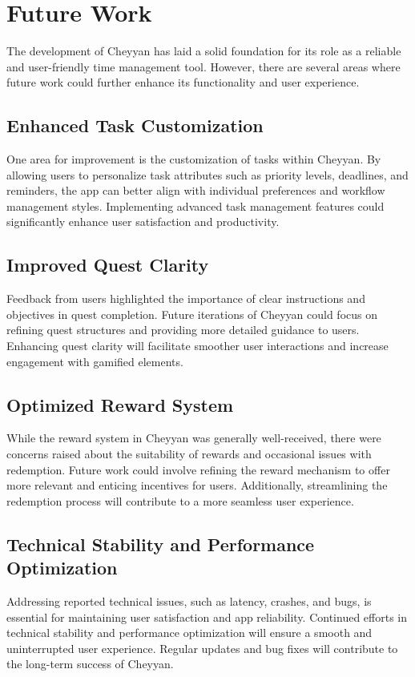 \documentclass{l4proj}
\begin{document}
\section{Future Work}
The development of Cheyyan has laid a solid foundation for its role as a reliable and user-friendly time management tool. However, there are several areas where future work could further enhance its functionality and user experience.

\subsection{Enhanced Task Customization}
One area for improvement is the customization of tasks within Cheyyan. By allowing users to personalize task attributes such as priority levels, deadlines, and reminders, the app can better align with individual preferences and workflow management styles. Implementing advanced task management features could significantly enhance user satisfaction and productivity.

\subsection{Improved Quest Clarity}
Feedback from users highlighted the importance of clear instructions and objectives in quest completion. Future iterations of Cheyyan could focus on refining quest structures and providing more detailed guidance to users. Enhancing quest clarity will facilitate smoother user interactions and increase engagement with gamified elements.

\subsection{Optimized Reward System}
While the reward system in Cheyyan was generally well-received, there were concerns raised about the suitability of rewards and occasional issues with redemption. Future work could involve refining the reward mechanism to offer more relevant and enticing incentives for users. Additionally, streamlining the redemption process will contribute to a more seamless user experience.

\subsection{Technical Stability and Performance Optimization}
Addressing reported technical issues, such as latency, crashes, and bugs, is essential for maintaining user satisfaction and app reliability. Continued efforts in technical stability and performance optimization will ensure a smooth and uninterrupted user experience. Regular updates and bug fixes will contribute to the long-term success of Cheyyan.
\end{document}
